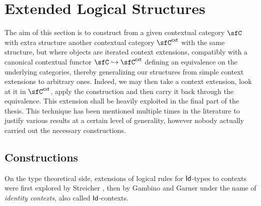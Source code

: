 \chapter{Extended Logical Structures}\label{chapter2}

The aim of this section is to construct from a given contextual category $\sfC$
with extra structure another contextual category $\sfC^{\cxt}$ with the same
structure, but where objects are iterated context extensions, compatibly with a
canonical contextual functor $\sfC\hookrightarrow\sfC^{\cxt}$ defining an
equivalence on the underlying categories, thereby
generalizing our structures from simple context extensions to arbitrary ones.
Indeed, we may then take a context extension, look at it in $\sfC^{\cxt}$, apply
the construction and then carry it back through the equivalence. This extension
shall be heavily exploited in the final part of the thesis. This technique has
been mentioned multiple times in the literature to justify various results at a
certain level of generality, however nobody actually carried out the necessary
constructions.

\section{Constructions}

On the type theoretical side, extensions of logical rules for $\operatorname{\mathsf{Id}}$-types to
contexts were first explored by Streicher \cite{Str93}, then by Gambino and
Garner \cite{GG08,Gar09b} under the name of \emph{identity contexts}, also
called $\operatorname{\mathsf{Id}}$-contexts.

